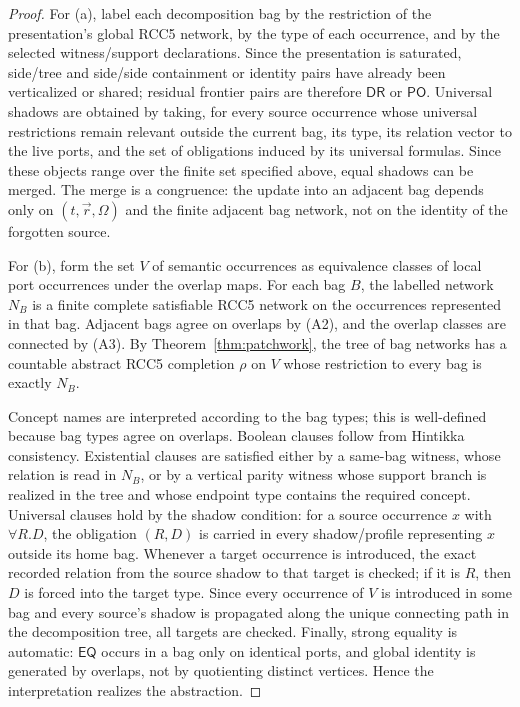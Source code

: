\documentclass[11pt]{article}
\newcommand{\EQ}{\mathsf{EQ}}
\newcommand{\PO}{\mathsf{PO}}
\newcommand{\DR}{\mathsf{DR}}
\begin{document}
\begin{proof}
For (a), label each decomposition bag by the restriction of the presentation's global RCC5
network, by the type of each occurrence, and by the selected witness/support declarations.
Since the presentation is saturated, side/tree and side/side containment or identity
pairs have already been verticalized or shared; residual frontier pairs are therefore
$\DR$ or $\PO$.  Universal shadows are obtained by taking, for every source occurrence
whose universal restrictions remain relevant outside the current bag, its type, its
relation vector to the live ports, and the set of obligations induced by its universal
formulas.  Since these objects range over the finite set specified above, equal shadows
can be merged.  The merge is a congruence: the update into an adjacent bag depends only on
$(t,\vec r,\Omega)$ and the finite adjacent bag network, not on the identity of the
forgotten source.

For (b), form the set $V$ of semantic occurrences as equivalence classes of local port
occurrences under the overlap maps.  For each bag $B$, the labelled network $N_B$ is a
finite complete satisfiable RCC5 network on the occurrences represented in that bag.
Adjacent bags agree on overlaps by (A2), and the overlap classes are connected by (A3).
By Theorem~\ref{thm:patchwork}, the tree of bag networks has a countable abstract RCC5
completion $\rho$ on $V$ whose restriction to every bag is exactly $N_B$.

Concept names are interpreted according to the bag types; this is well-defined because
bag types agree on overlaps.  Boolean clauses follow from Hintikka consistency.
Existential clauses are satisfied either by a same-bag witness, whose relation is read in
$N_B$, or by a vertical parity witness whose support branch is realized in the tree and
whose endpoint type contains the required concept.  Universal clauses hold by the shadow
condition: for a source occurrence $x$ with $\forall R.D$, the obligation $(R,D)$ is
carried in every shadow/profile representing $x$ outside its home bag.  Whenever a target
occurrence is introduced, the exact recorded relation from the source shadow to that
target is checked; if it is $R$, then $D$ is forced into the target type.  Since every
occurrence of $V$ is introduced in some bag and every source's shadow is propagated along
the unique connecting path in the decomposition tree, all targets are checked.  Finally,
strong equality is automatic: $\EQ$ occurs in a bag only on identical ports, and global
identity is generated by overlaps, not by quotienting distinct vertices.  Hence the
interpretation realizes the abstraction.
\end{proof}
\end{document}
